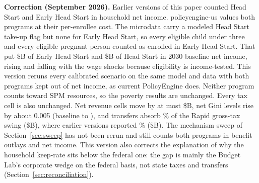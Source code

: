 \documentclass[11pt]{article}
\begin{document}
\medskip
\noindent\textbf{Correction (September 2026).} Earlier versions of this paper
counted Head Start and Early Head Start in household net income.
policyengine-us \genModelVersion{} values both programs at their per-enrollee
cost. The microdata carry a modeled Head Start take-up flag but none for
Early Head Start, so every eligible child under three and every eligible pregnant person counted
as enrolled in Early Head Start. That put \$\genPubEarlyHeadStartB B of Early
Head Start and \$\genPubHeadStartB B of Head Start in 2030 baseline net income,
rising and falling with the wage shocks because eligibility is income-tested.
This version reruns every calibrated scenario on the same model
and data with both programs kept out of net income, as current PolicyEngine
does. Neither program counts toward SPM resources, so the poverty results are
unchanged. Every tax cell is also unchanged. Net revenue cells move by at most
\$\genCorrMaxRevMoveB B, net Gini levels rise by about 0.005 (baseline
\genPubBaselineGini{} to \genBaselineGini{}), and transfers absorb
\genCorrTransferAbsorbPct\% of the Rapid gross-tax swing (\$\genCorrTransferSwing B),
where earlier versions reported \genPubTransferAbsorbPct\%
(\$\genPubTransferSwing B). The mechanism sweep of Section~\ref{sec:sweep} has
not been rerun and still counts both programs in benefit outlays and net
income. This version also corrects the explanation of why the household
keep-rate sits below the federal one: the gap is mainly the Budget Lab's
corporate wedge on the federal basis, not state taxes and transfers
(Section~\ref{sec:reconciliation}).

\medskip








\clearpage

\clearpage
\appendix

\end{document}
